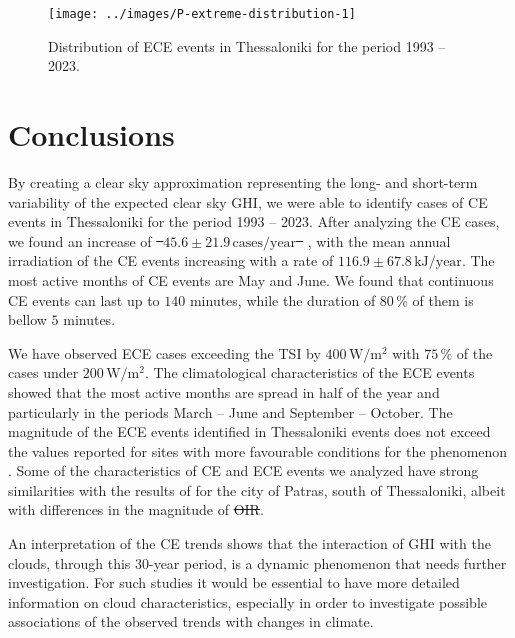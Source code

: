 \documentclass[preprint, 5p,
authoryear]{elsarticle} %
\providecommand{\DIFaddtex}[1]{{\protect\color{blue}\uwave{#1}}} %
\providecommand{\DIFdeltex}[1]{{\protect\color{red}\sout{#1}}}                      %
\providecommand{\DIFaddbegin}{} %
\providecommand{\DIFaddend}{} %
\providecommand{\DIFdelbegin}{} %
\providecommand{\DIFdelend}{} %
\providecommand{\DIFadd}[1]{\texorpdfstring{\DIFaddtex{#1}}{#1}} %
\providecommand{\DIFdel}[1]{\texorpdfstring{\DIFdeltex{#1}}{}} %
\newcommand{\DIFscaledelfig}{0.5}
\newlength{\DIFdelgraphicswidth} %
\newlength{\DIFdelgraphicsheight} %
\newcommand{\DIFaddincludegraphics}[2][]{{\color{blue}\fbox{\DIFOincludegraphics[#1]{#2}}}} %
\newcommand{\DIFdelincludegraphics}[2][]{%
\sbox{\DIFdelgraphicsbox}{\DIFOincludegraphics[#1]{#2}}%
\settoboxwidth{\DIFdelgraphicswidth}{\DIFdelgraphicsbox} %
\settoboxtotalheight{\DIFdelgraphicsheight}{\DIFdelgraphicsbox} %
\scalebox{\DIFscaledelfig}{%
\parbox[b]{\DIFdelgraphicswidth}{\usebox{\DIFdelgraphicsbox}\\[-\baselineskip] \rule{\DIFdelgraphicswidth}{0em}}\llap{\resizebox{\DIFdelgraphicswidth}{\DIFdelgraphicsheight}{%
\setlength{\unitlength}{\DIFdelgraphicswidth}%
\begin{picture}(1,1)%
\thicklines\linethickness{2pt} %
{\color[rgb]{1,0,0}\put(0,0){\framebox(1,1){}}}%
{\color[rgb]{1,0,0}\put(0,0){\line( 1,1){1}}}%
{\color[rgb]{1,0,0}\put(0,1){\line(1,-1){1}}}%
\end{picture}%
}\hspace*{3pt}}} %
} %
\DeclareRobustCommand{\DIFaddbegin}{\DIFOaddbegin \let\includegraphics\DIFaddincludegraphics} %
\DeclareRobustCommand{\DIFaddend}{\DIFOaddend \let\includegraphics\DIFOincludegraphics} %
\DeclareRobustCommand{\DIFdelbegin}{\DIFOdelbegin \let\includegraphics\DIFdelincludegraphics} %
\DeclareRobustCommand{\DIFdelend}{\DIFOaddend \let\includegraphics\DIFOincludegraphics} %
\begin{document}
\begin{figure}

{\centering \texttt{[image: ../images/P-extreme-distribution-1]} 

}

\caption{Distribution of ECE events in Thessaloniki for the period 1993 -- 2023.}\label{fig:P-extreme-distribution}
\end{figure}

\hypertarget{conclusions}{%
\section{Conclusions}\label{conclusions}}

By creating a clear sky approximation representing the long- and
short-term variability of the expected clear sky GHI, we were able to
identify cases of CE events in Thessaloniki for the period 1993 -- 2023.
After analyzing the CE cases, we found an increase of
\DIFdelbegin \DIFdel{%
\mbox{%
\(45.6\pm 21.9\,\text{cases}/\text{year}\)
}%
}\DIFdelend \DIFaddbegin \DIFadd{%
\mbox{%
\(+45.6\pm 21.9\,\text{cases}/\text{year}\)
}%
}\DIFaddend , with the mean annual
irradiation of the CE events increasing with a rate of
\DIFdelbegin \DIFdel{\(116.9\pm 67.8\,\text{kJ}/\text{year}\)}\DIFdelend \DIFaddbegin \DIFadd{\(+116.9\pm 67.8\,\text{kJ}/\text{year}\)}\DIFaddend . The most active months of CE
events are May and June. We found that continuous CE events can last up
to \(140\) minutes, while the duration of \(80\,\%\) of them is bellow
\(5\) minutes.

We have observed ECE cases exceeding the TSI by
\(400\,\text{W}/\text{m}^{2}\) with \(75\,\%\) of the cases under
\(200\,\text{W}/\text{m}^{2}\). The climatological characteristics of
the ECE events showed that the most active months are spread in half of
the year and particularly in the periods March -- June and September --
October. The magnitude of the ECE events identified in Thessaloniki
events does not exceed the values reported for sites with more
favourable conditions for the phenomenon \citep[e.g.,][]{Cordero2023}.
Some of the characteristics of CE and ECE events we analyzed have strong
similarities with the results of \citet{Vamvakas2020} for the city of
Patras, south of Thessaloniki, albeit with differences in the magnitude
of \DIFdelbegin \DIFdel{OIR}\DIFdelend \DIFaddbegin \DIFadd{OI}\DIFaddend .

An interpretation of the CE trends shows that the interaction of GHI
with the clouds, through this 30-year period, is a dynamic phenomenon
that needs further investigation. For such studies it would be essential
to have more detailed information on cloud characteristics, especially
in order to investigate possible associations of the observed trends
with changes in climate.


\end{document}
